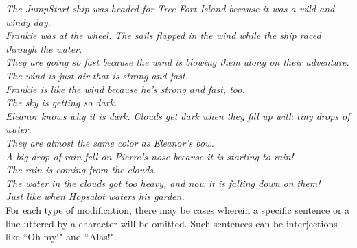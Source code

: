 	\noindent
	\hspace{1 in}\emph{The JumpStart ship was headed for Tree Fort Island because it was a wild and windy day.} \\
	\hspace*{1 in}\emph{Frankie was at the wheel. The sails flapped in the wind while the ship raced through the water.} \\
	\hspace*{1 in}\emph{They are going so fast because the wind is blowing them along on their adventure. The wind is just air that is strong and fast.} \\
	\hspace*{1 in}\emph{Frankie is like the wind because he's strong and fast, too.} \\
	\hspace*{1 in}\emph{The sky is getting so dark.}\\
	\hspace*{1 in}\emph{Eleanor knows why it is dark. Clouds get dark when they fill up with tiny drops of water.} \\
	\hspace*{1 in}\emph{They are almost the same color as Eleanor's bow.} \\
	\hspace*{1 in}\emph{A big drop of rain fell on Pierre's nose because it is starting to rain!} \\
	\hspace*{1 in}\emph{The rain is coming from the clouds.} \\
	\hspace*{1 in}\emph{The water in the clouds got too heavy, and now it is falling down on them!} \\
	\hspace*{1 in}\emph{Just like when Hopsalot waters his garden.} \\
	
For each type of modification, there may be cases wherein a specific sentence or a line uttered by a character will be omitted. Such sentences can be interjections like ``Oh my!" and ``Alas!".